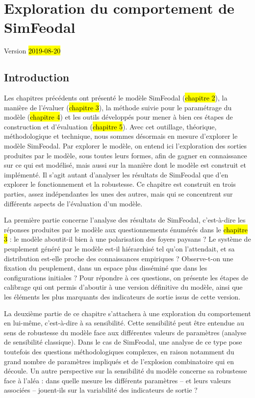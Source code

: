 \chapter{Exploration du comportement de SimFeodal}
\label{chap:chap6}
\begin{center}
	{\large Version \hl{2019-08-20}}
\end{center}
\minitoc

\clearpage
\section*{Introduction}

Les chapitres précédents ont présenté le modèle SimFeodal (\hl{chapitre 2}), la manière de l'évaluer (\hl{chapitre 3}), la méthode suivie pour le paramétrage du modèle (\hl{chapitre 4}) et les outils développés pour mener à bien ces étapes de construction et d'évaluation (\hl{chapitre 5}).
Avec cet outillage, théorique, méthodologique et technique, nous sommes désormais en mesure d'explorer le modèle SimFeodal.
Par \og explorer le modèle\fg{}, on entend ici l'exploration des sorties produites par le modèle, sous toutes leurs formes, afin de gagner en connaissance sur ce qui est modélisé, mais aussi sur la manière dont le modèle est construit et implémenté.
Il s'agit autant d'analyser les \og résultats\fg{} de SimFeodal que d'en explorer le fonctionnement et la robustesse.
Ce chapitre est construit en trois parties, assez indépendantes les unes des autres, mais qui se concentrent sur différents aspects de l'évaluation d'un modèle.

La première partie concerne l'analyse des \og résultats\fg{} de SimFeodal, c'est-à-dire les réponses produites par le modèle aux questionnements énumérés dans le \hl{chapitre 3} :
le modèle aboutit-il bien à une polarisation des foyers paysans ?
Le système de peuplement généré par le modèle est-il hiérarchisé tel qu'on l'attendait, et sa distribution est-elle proche des connaissances empiriques ?
Observe-t-on une fixation du peuplement, dans un espace plus disséminé que dans les configurations initiales ?
Pour répondre à ces questions, on présente les étapes de calibrage qui ont permis d'aboutir à une version \og définitive\fg{} du modèle, ainsi que les éléments les plus marquants des indicateurs de sortie issus de cette version.

La deuxième partie de ce chapitre s'attachera à une exploration du comportement en lui-même, c'est-à-dire à sa sensibilité.
Cette sensibilité peut être entendue au sens de robustesse du modèle face aux différentes valeurs de paramètres (analyse de sensibilité classique).
Dans le cas de SimFeodal, une analyse de ce type pose toutefois des questions méthodologiques complexes, en raison notamment du grand nombre de paramètres impliqués et de \og l'explosion combinatoire\fg{} qui en découle.
Un autre perspective sur la sensibilité du modèle concerne sa robustesse face à l'aléa : dans quelle mesure les différents paramètres -- et leurs valeurs associées -- jouent-ils sur la variabilité des indicateurs de sortie ?

